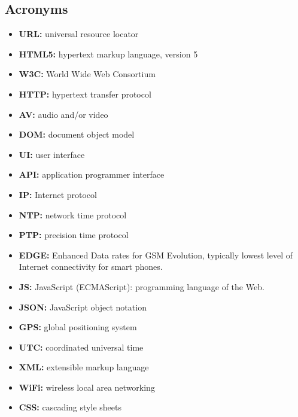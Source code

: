 \subsection{Acronyms}
\begin{itemize}
\item{\textbf{URL:} universal resource locator}
\item{\textbf{HTML5:} hypertext markup language, version 5}
\item{\textbf{W3C:} World Wide Web Consortium}
\item{\textbf{HTTP:} hypertext transfer protocol}
\item{\textbf{AV:} audio and/or video}
\item{\textbf{DOM:} document object model}
\item{\textbf{UI:} user interface}
\item{\textbf{API:} application programmer interface}
\item{\textbf{IP:} Internet protocol}
\item{\textbf{NTP:} network time protocol}
\item{\textbf{PTP:} precision time protocol}
\item{\textbf{EDGE:} Enhanced Data rates for GSM Evolution, typically lowest level of Internet connectivity for smart phones.}
\item{\textbf{JS:}} JavaScript (ECMAScript): programming language of the Web.
\item{\textbf{JSON:} JavaScript object notation}
\item{\textbf{GPS:} global positioning system}
\item{\textbf{UTC:} coordinated universal time}
\item{\textbf{XML:} extensible markup language}
\item{\textbf{WiFi:} wireless local area networking}
\item{\textbf{CSS:}} cascading style sheets
\end{itemize}